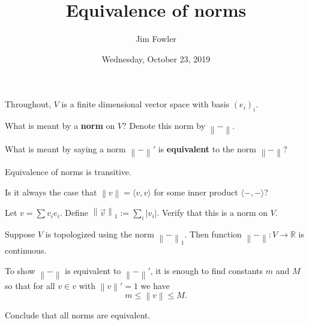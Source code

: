 \documentclass{homework}
\author{Jim Fowler}
\title{Equivalence of norms}
\date{Wednesday, October 23, 2019}
\newcommand{\norm}[1]{\left\|#1\right\|}
\begin{document}
\maketitle

Throughout, $V$ is a finite dimensional vector space with basis $(e_i)_i$.

\begin{problem}
  What is meant by a \textbf{norm} on $V$?  Denote this norm by $\norm{-}$.
\end{problem}

\vfill

\begin{problem}
  What is meant by saying a norm $\norm{-}'$ is \textbf{equivalent} to the norm $\norm{-}$?
\end{problem}

\vfill

\begin{problem}
  Equivalence of norms is transitive.
\end{problem}

\vfill

\begin{problem}
  Is it always the case that $\norm{v} = \langle v, v \rangle$ for some inner product $\langle -, - \rangle$?
\end{problem}

\vfill

\begin{problem}
  Let $v = \sum v_i e_i$.   Define $\norm{\vec{v}}_1 := \sum_i |v_i|$.  Verify that this is a norm on $V$.
\end{problem}

\vfill

\begin{problem}
  Suppose $V$ is topologized using the norm $\norm{-}_1$.  Then function $\norm{-} : V \to \mathbb{R}$ is continuous.
\end{problem}

\vfill

\begin{problem}
  To show $\norm{-}$ is equivalent to $\norm{-}'$, it is enough to find constants $m$ and $M$ so that for all $v \in v$ with $\norm{v}' = 1$ we have
  \[
    m \leq \norm{v} \leq M.
  \]
\end{problem}

\vfill

\begin{problem}
  Conclude that all norms are equivalent.
\end{problem}
\end{document}
